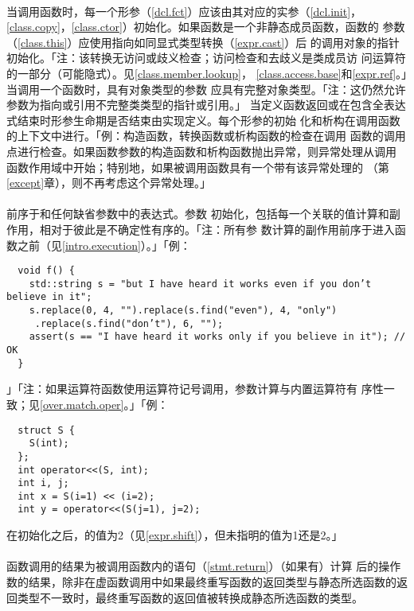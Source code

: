 \paragraph{}
当调用函数时，每一个形参（\ref{dcl.fct}）应该由其对应的实参（\ref{dcl.init}，
\ref{class.copy}，\ref{class.ctor}）初始化。如果函数是一个非静态成员函数，函数的
参数（\ref{class.this}）应使用指向如同显式类型转换（\ref{expr.cast}）后
的调用对象的指针初始化。「注：该转换无访问或歧义检查；访问检查和去歧义是类成员访
问运算符的一部分（可能隐式）。见\ref{class.member.lookup}，
\ref{class.access.base}和\ref{expr.ref}。」当调用一个函数时，具有对象类型的参数
应具有完整对象类型。「注：这仍然允许参数为指向或引用不完整类类型的指针或引用。」
当定义函数返回或在包含全表达式结束时形参生命期是否结束由实现定义。每个形参的初始
化和析构在调用函数的上下文中进行。「例：构造函数，转换函数或析构函数的检查在调用
函数的调用点进行检查。如果函数参数的构造函数和析构函数抛出异常，则异常处理从调用
函数作用域中开始；特别地，如果被调用函数具有一个带有该异常处理的
（第\ref{except}章），则不再考虑这个异常处理。」

\paragraph{}
前序于和任何缺省参数中的表达式。参数
初始化，包括每一个关联的值计算和副作用，相对于彼此是不确定性有序的。「注：所有参
数计算的副作用前序于进入函数之前（见\ref{intro.execution}）。」「例：
\begin{lstlisting}
  void f() {
    std::string s = "but I have heard it works even if you don’t believe in it";
    s.replace(0, 4, "").replace(s.find("even"), 4, "only")
     .replace(s.find("don’t"), 6, "");
    assert(s == "I have heard it works only if you believe in it"); // OK
  }
\end{lstlisting}」「注：如果运算符函数使用运算符记号调用，参数计算与内置运算符有
序性一致；见\ref{over.match.oper}。」「例：
\begin{lstlisting}
  struct S {
    S(int);
  };
  int operator<<(S, int);
  int i, j;
  int x = S(i=1) << (i=2);
  int y = operator<<(S(j=1), j=2);
\end{lstlisting}
在初始化之后，的值为2（见\ref{expr.shift}），但未指明的值为1还是2。」

\paragraph{}
函数调用的结果为被调用函数内的语句（\ref{stmt.return}）（如果有）计算
后的操作数的结果，除非在虚函数调用中如果最终重写函数的返回类型与静态所选函数的返
回类型不一致时，最终重写函数的返回值被转换成静态所选函数的类型。

